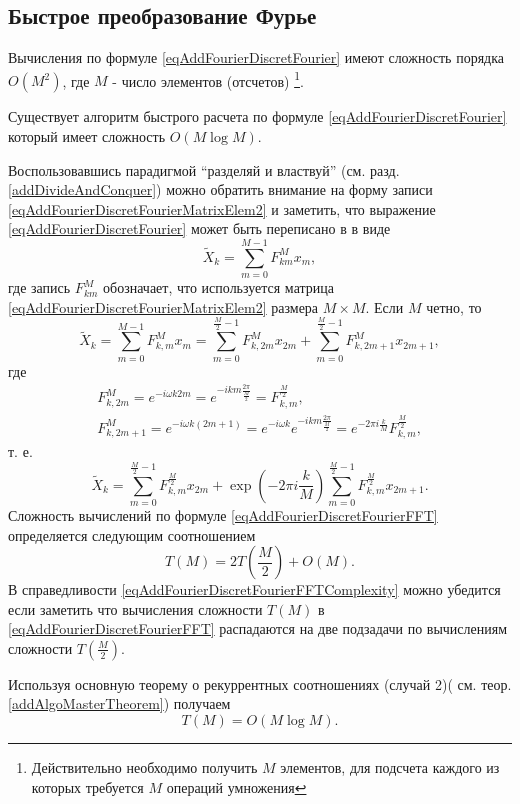\subsection{Быстрое преобразование Фурье}
Вычисления по формуле \eqref{eqAddFourierDiscretFourier} имеют
сложность порядка $O\left(M^2\right)$, где $M$ - число элементов (отсчетов)
\footnote{Действительно необходимо получить $M$ элементов, для
  подсчета каждого из которых требуется $M$ операций умножения}. 

Существует алгоритм быстрого расчета по формуле
\eqref{eqAddFourierDiscretFourier} который имеет сложность
$O\left(M \log{M}\right)$.

Воспользовавшись парадигмой ``разделяй и властвуй''
(см. разд. \ref{addDivideAndConquer}) можно 
обратить внимание на форму записи
\eqref{eqAddFourierDiscretFourierMatrixElem2} и 
заметить, что выражение
\eqref{eqAddFourierDiscretFourier} может быть переписано в
в виде 
\begin{equation}
\tilde{X}_k = \sum^{M - 1}_{m = 0} F_{km}^{M} x_m,
\nonumber
\end{equation}
где запись $F_{km}^{M}$ обозначает, что используется матрица
\eqref{eqAddFourierDiscretFourierMatrixElem2} размера $M\times M$.
Если $M$ четно, то 
\begin{equation}
\tilde{X}_k = \sum^{M - 1}_{m = 0} F_{k,m}^{M} x_m = 
\sum^{\frac{M}{2} - 1}_{m = 0} F_{k,2m}^M x_{2m} +
\sum^{\frac{M}{2} - 1}_{m = 0} F_{k,2m + 1}^M x_{2m + 1},
\nonumber
\end{equation}
где
\begin{eqnarray}
F_{k,2m}^{M} = e^{-i \omega k 2m} = e^{-i k m \frac{2\pi}{\frac{M}{2}}
} = F_{k,m}^{\frac{M}{2}},
\nonumber \\
F_{k,2m + 1}^{M} = e^{-i \omega k \left(2m+1\right)} = 
e^{-i \omega k}e^{-i k m \frac{2\pi}{\frac{M}{2}}} = 
e^{-2\pi i \frac{k}{M}}F_{k,m}^{\frac{M}{2}},
\nonumber
\end{eqnarray}
т. е.
\begin{equation}
\tilde{X}_k = \sum^{\frac{M}{2} - 1}_{m = 0} F_{k,m}^{\frac{M}{2}} x_{2m} +
\exp{\left(-2\pi i \frac{k}{M}\right)}
\sum^{\frac{M}{2} - 1}_{m = 0}  F_{k,m}^{\frac{M}{2}} x_{2m + 1}.
\label{eqAddFourierDiscretFourierFFT}
\end{equation}
Сложность вычислений по формуле
\eqref{eqAddFourierDiscretFourierFFT} определяется 
следующим соотношением
\begin{equation}
T\left( M \right) = 2 T\left( \frac{M}{2} \right) + O\left( M \right).
\label{eqAddFourierDiscretFourierFFTComplexity}
\end{equation}
В справедливости
\eqref{eqAddFourierDiscretFourierFFTComplexity} можно убедится
если заметить что вычисления сложности $T\left( M \right)$ в 
\eqref{eqAddFourierDiscretFourierFFT} распадаются 
на две подзадачи по вычислениям сложности $T\left( \frac{M}{2}
\right)$.

Используя основную теорему о рекуррентных соотношениях (случай 2)(
см. теор. \ref{addAlgoMasterTheorem}) 
получаем 
\begin{equation}
T\left( M \right) = O\left( M \log{M} \right).
\nonumber
\end{equation}

